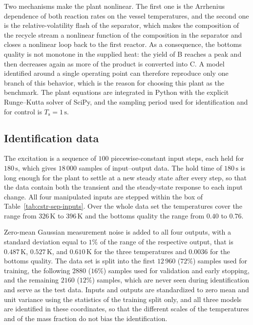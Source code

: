 \documentclass[preprint,12pt,authoryear]{elsarticle}
\theoremstyle{remark}
\newcommand{\ui}[2]{#1_{\text{#2}}}
\newcommand{\Ts}{\ui{T}{s}}
\begin{document}
Two mechanisms make the plant nonlinear. The first one is the Arrhenius dependence of both reaction rates on the vessel temperatures, and the second one is the relative-volatility flash of the separator, which makes the composition of the recycle stream a nonlinear function of the composition in the separator and closes a nonlinear loop back to the first reactor. As a consequence, the bottoms quality is not monotone in the supplied heat: the yield of B reaches a peak and then decreases again as more of the product is converted into C. A model identified around a single operating point can therefore reproduce only one branch of this behavior, which is the reason for choosing this plant as the benchmark. The plant equations are integrated in Python with the explicit Runge--Kutta solver of SciPy, and the sampling period used for identification and for control is $\Ts = 1\,\text{s}$.

\subsection{Identification data}

The excitation is a sequence of $100$ piecewise-constant input steps, each held for $180\,\text{s}$, which gives $18\,000$ samples of input--output data. The hold time of $180\,\text{s}$ is long enough for the plant to settle at a new steady state after every step, so that the data contain both the transient and the steady-state response to each input change. All four manipulated inputs are stepped within the box of Table~\ref{tab:cstr-sep-inputs}.
Over the whole data set the temperatures cover the range from $326\,\text{K}$ to $396\,\text{K}$ and the bottoms quality the range from $0.40$ to $0.76$.

Zero-mean Gaussian measurement noise is added to all four outputs, with a standard deviation equal to $1\%$ of the range of the respective output, that is $0.487\,\text{K}$, $0.527\,\text{K}$, and $0.610\,\text{K}$ for the three temperatures and $0.0036$ for the bottoms quality.
The data set is split into the first $12\,960$ ($72\%$) samples used for training, the following $2880$ ($16\%$) samples used for validation and early stopping, and the remaining $2160$ ($12\%$) samples, which are never seen during identification and serve as the test data. Inputs and outputs are standardized to zero mean and unit variance using the statistics of the training split only, and all three models are identified in these coordinates, so that the different scales of the temperatures and of the mass fraction do not bias the identification.
\end{document}
